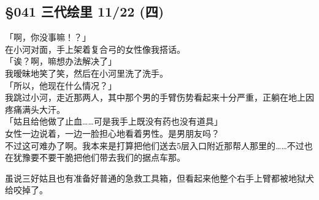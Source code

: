 \subsection{§041 三代绘里 11/22 (四)}

「啊，你没事嘛！？」\\

在小河对面，手上架着复合弓的女性像我搭话。\\

「诶？啊，嘛想办法解决了」\\

我暧昧地笑了笑，然后在小河里洗了洗手。\\

「所以，他现在什么情况？」\\

我跳过小河，走近那两人，其中那个男的手臂伤势看起来十分严重，正躺在地上因疼痛满头大汗。\\

「姑且给他做了止血……可是我手上既没有药也没有道具」\\

女性一边说着，一边一脸担心地看着男性。是男朋友吗？\\

不过这可难办了啊。我本来是打算把他们送去5层入口附近那帮人那里的……不过也在犹豫要不要干脆把他们带去我们的据点车那。

虽说三好姑且也有准备好普通的急救工具箱，但看起来他整个右手上臂都被地狱犬给咬掉了。

